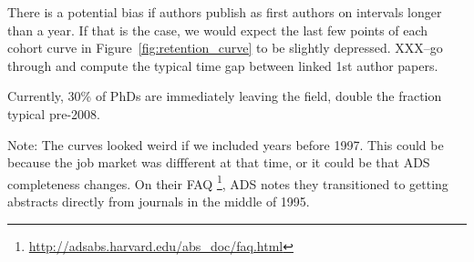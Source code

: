 \documentclass[preprint2]{aastex}
\begin{document}
There is a potential bias if authors publish as first authors on intervals longer than a year.  If that is the case, we would expect the last few points of each cohort curve in Figure~\ref{fig:retention_curve} to be slightly depressed.  XXX--go through and compute the typical time gap between linked 1st author papers.  

Currently, 30\% of PhDs are immediately leaving the field, double the fraction typical pre-2008.  







Note:  The curves looked weird if we included years before 1997. This could be because the job market was diffferent at that time, or it could be that ADS completeness changes. On their FAQ \footnote{\url{http://adsabs.harvard.edu/abs\_doc/faq.html}}, ADS notes they transitioned to getting abstracts directly from journals in the middle of 1995.
\end{document}
